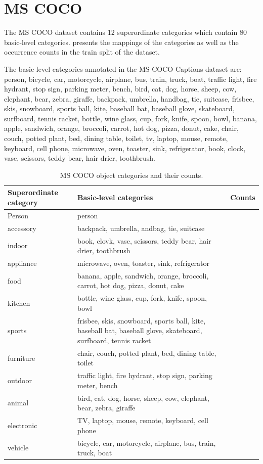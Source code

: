 \section{MS COCO}
The MS COCO dataset \parencite{chen2015microsoft} contains 12 superordinate categories which contain 80 basic-level categories.  presents the mappings of the categories as well as the occurrence counts in the train split of the dataset. 

The basic-level categories annotated in the MS COCO Captions dataset are: person, bicycle, car, motorcycle, airplane, bus, train, truck, boat, traffic light, fire hydrant, stop sign, parking meter, bench, bird, cat, dog, horse, sheep, cow, elephant, bear, zebra, giraffe, backpack, umbrella, handbag, tie, suitcase, frisbee, skis, snowboard, sports ball, kite, baseball bat, baseball glove, skateboard, surfboard, tennis racket, bottle, wine glass, cup, fork, knife, spoon, bowl, banana, apple, sandwich, orange, broccoli, carrot, hot dog, pizza, donut, cake, chair, couch, potted plant, bed, dining table, toilet, tv, laptop, mouse, remote, keyboard, cell phone, microwave, oven, toaster, sink, refrigerator, book, clock, vase, scissors, teddy bear, hair drier, toothbrush.

\begin{table}[]
	\begin{tabularx}{\linewidth}{|X|X|l|}
		\hline
		\textbf{Superordinate category}                                    & \textbf{Basic-level categories} & \textbf{Counts}  \\ \hline
		Person & person & \\  \hline
		accessory & backpack, umbrella, andbag, tie, suitcase & \\  \hline
		indoor & book, clovk, vase, scissors, teddy bear, hair drier, toothbrush & \\  \hline
		appliance & microwave, oven, toaster, sink, refrigerator & \\  \hline
		food & banana, apple, sandwich, orange, broccoli, carrot, hot dog, pizza, donut, cake & \\  \hline
		kitchen & bottle, wine glass, cup, fork, knife, spoon, bowl & \\  \hline
		sports & frisbee, skis, snowboard, sports ball, kite, baseball bat, baseball glove, skateboard, surfboard, tennis racket & \\  \hline
		furniture & chair, couch, potted plant, bed, dining table, toilet & \\  \hline
		outdoor & traffic light, fire hydrant, stop sign, parking meter, bench & \\  \hline
		animal & bird, cat, dog, horse, sheep, cow, elephant, bear, zebra, giraffe & \\  \hline
		electronic & TV, laptop, mouse, remote, keyboard, cell phone & \\  \hline
		vehicle & bicycle, car, motorcycle, airplane, bus, train, truck, boat & \\ 
		\hline
	\end{tabularx}
	\caption{\label{tab:app_coco_categories} MS COCO object categories and their counts.}
\end{table}

